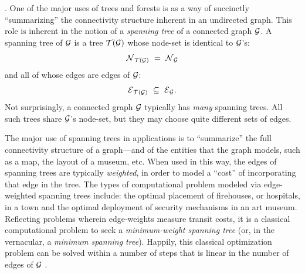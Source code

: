 .
One of the major uses of trees and forests is as a way of succinctly
``summarizing'' the connectivity structure inherent in an undirected
graph.  This role is inherent in the notion of a {\it spanning tree}
  
of a connected graph $\mbox{$\cal G$}$.  A spanning tree of $\mbox{$\cal G$}$ is a tree $\mbox{$\cal T$}(\mbox{$\cal G$})$
whose node-set is identical to $\mbox{$\cal G$}$'s:
\[ \mbox{$\cal N$}_{\mbox{{\scriptsize $\cal T$}}(\mbox{{\scriptsize $\cal G$}})} \ = \ \mbox{$\cal N$}_{\mbox{{\scriptsize $\cal G$}}} \]
and all of whose edges are edges of $\mbox{$\cal G$}$:
\[ \mbox{$\cal E$}_{\mbox{{\scriptsize $\cal T$}}(\mbox{{\scriptsize $\cal G$}})} \ \subseteq \ \mbox{$\cal E$}_{\mbox{{\scriptsize $\cal G$}}}. \]
Not surprisingly, a connected graph $\mbox{$\cal G$}$  typically has {\em many}
spanning trees.  All such trees share $\mbox{$\cal G$}$'s node-set, but they may
choose quite different sets of edges.



The major use of spanning trees in applications is to ``summarize''
the full connectivity structure of a graph---and of the entities that
the graph models, such as a map, the layout of a museum, etc.  When
used in this way, the edges of spanning trees are typically {\em
  weighted},  in order to
model a ``cost'' of incorporating that edge in the tree.  The types of
computational problem modeled via edge-weighted spanning trees
include: the optimal placement of firehouses, or hospitals, in a town
and the optimal deployment of security mechanisms in an art museum.
Reflecting problems wherein edge-weights measure transit costs, it is
a classical computational problem to seek a {\em minimum-weight
  spanning tree} 
 (or, in the vernacular, a {\em
  minimum spanning tree}).  Happily, this classical optimization
problem can be solved within a number of steps that is linear in the
number of edges of $\mbox{$\cal G$}$ \cite{CLRS}.


